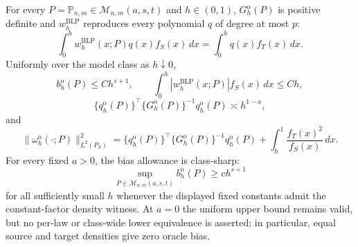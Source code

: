 For every \(P=\mathbb P_{n,m}\in\mathcal M_{n,m}(a,s,t)\) and \(h\in(0,1)\), \(G_h^{\mathrm o}(P)\) is positive definite and \(w_h^{\mathrm{BLP}}\) reproduces every polynomial \(q\) of degree at most \(p\):
\[
\int_0^h w_h^{\mathrm{BLP}}(x;P)q(x)f_S(x)\,dx
=\int_0^h q(x)f_T(x)\,dx.
\]
Uniformly over the model class as \(h\downarrow0\),
\[
b_h^{\mathrm o}(P)\le C h^{s+1},
\qquad
\int_0^h|w_h^{\mathrm{BLP}}(x;P)|f_S(x)\,dx\le Ch,
\]
\[
\{q_h^{\mathrm o}(P)\}^\top\{G_h^{\mathrm o}(P)\}^{-1}q_h^{\mathrm o}(P)\asymp h^{1-a},
\]
and
\[
\|\omega_h^{\mathrm o}(\cdot;P)\|_{L^2(P_S)}^2
=\{q_h^{\mathrm o}(P)\}^\top\{G_h^{\mathrm o}(P)\}^{-1}q_h^{\mathrm o}(P)
+\int_h^1\frac{f_T(x)^2}{f_S(x)}\,dx.
\]
For every fixed \(a>0\), the bias allowance is class-sharp:
\[
\sup_{P\in\mathcal M_{n,m}(a,s,t)}b_h^{\mathrm o}(P)\ge c h^{s+1}
\]
for all sufficiently small \(h\) whenever the displayed fixed constants admit the constant-factor density witness. At \(a=0\) the uniform upper bound remains valid, but no per-law or class-wide lower equivalence is asserted; in particular, equal source and target densities give zero oracle bias.